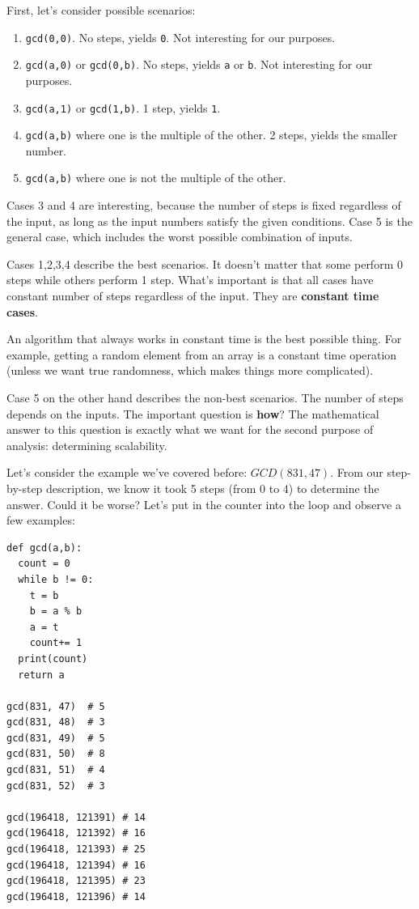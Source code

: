 \documentclass[a4paper, justified, notitlepage, sfsidenotes, notoc]{tufte-book}
\begin{document}
First, let's consider possible scenarios:

\begin{enumerate}
\item \texttt{gcd(0,0)}. No steps, yields \texttt{0}. Not interesting for our purposes.
\item \texttt{gcd(a,0)} or \texttt{gcd(0,b)}. No steps, yields \texttt{a} or \texttt{b}. Not interesting for our purposes.
\item \texttt{gcd(a,1)} or \texttt{gcd(1,b)}. 1 step, yields \texttt{1}.
\item \texttt{gcd(a,b)} where one is the multiple of the other. 2 steps, yields the smaller number.
\item \texttt{gcd(a,b)} where one is not the multiple of the other.
\end{enumerate}

Cases 3 and 4 are interesting, because the number of steps is fixed regardless of the input, as long as the input numbers satisfy the given conditions. Case 5 is the general case, which includes the worst possible combination of inputs.

Cases 1,2,3,4 describe the best scenarios. It doesn't matter that some perform 0 steps while others perform 1 step. What's important is that all cases have constant number of steps regardless of the input. They are \textbf{\textbf{constant time cases}}.

An algorithm that always works in constant time is the best possible thing. For example, getting a random element from an array is a constant time operation (unless we want true randomness, which makes things more complicated).

Case 5 on the other hand describes the non-best scenarios. The number of steps depends on the inputs. The important question is \textbf{how}? The mathematical answer to this question is exactly what we want for the second purpose of analysis: determining scalability.

Let's consider the example we've covered before: \(GCD(831,47)\). From our step-by-step description, we know it took 5 steps (from 0 to 4) to determine the answer. Could it be worse? Let's put in the counter into the loop and observe a few examples:

\begin{verbatim}
def gcd(a,b):
  count = 0
  while b != 0:
    t = b
    b = a % b
    a = t
    count+= 1
  print(count)
  return a

gcd(831, 47)  # 5
gcd(831, 48)  # 3
gcd(831, 49)  # 5
gcd(831, 50)  # 8
gcd(831, 51)  # 4
gcd(831, 52)  # 3

gcd(196418, 121391) # 14
gcd(196418, 121392) # 16
gcd(196418, 121393) # 25
gcd(196418, 121394) # 16
gcd(196418, 121395) # 23
gcd(196418, 121396) # 14
\end{verbatim}
\end{document}
